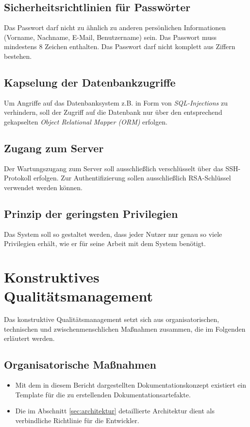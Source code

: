 \documentclass[a4paper,11pt,listof=numbered,glossary=totoc,parskip=half,toc=bib]{scrreprt}
\begin{document}
	\subsection{Sicherheitsrichtlinien für Passwörter}
	 Das Passwort darf nicht zu ähnlich zu anderen persönlichen Informationen (Vorname, Nachname, E-Mail, Benutzername) sein.
    Das Passwort muss mindestens 8 Zeichen enthalten.
    Das Passwort darf nicht komplett aus Ziffern bestehen.	
    
    \subsection{Kapselung der Datenbankzugriffe}
    Um Angriffe auf das Datenbanksystem z.B. in Form von \textit{SQL-Injections} zu verhindern, soll der Zugriff auf die Datenbank nur über den entsprechend gekapselten \textit{Object Relational Mapper (ORM)} erfolgen.
	
	\subsection{Zugang zum Server}
	Der Wartungszugang zum Server soll ausschließlich verschlüsselt über das SSH-Protokoll erfolgen. Zur Authentifizierung sollen ausschließlich RSA-Schlüssel verwendet werden können.
	
	\subsection{Prinzip der geringsten Privilegien}
	Das System soll so gestaltet werden, dass jeder Nutzer nur genau so viele Privilegien erhält, wie er für seine Arbeit mit dem System benötigt.
	
	\section{Konstruktives Qualitätsmanagement}
	Das konstruktive Qualitätsmanagement setzt sich aus organisatorischen, technischen und zwischenmenschlichen Maßnahmen zusammen, die im Folgenden erläutert werden.
	
	\subsection{Organisatorische Maßnahmen}
	\begin{itemize}
		\item Mit dem in diesem Bericht dargestellten Dokumentationskonzept existiert ein Template für die zu erstellenden Dokumentationsartefakte.
		\item Die im Abschnitt \ref{sec:architektur} detaillierte Architektur dient als verbindliche Richtlinie für die Entwickler.
	\end{itemize}		
	
\end{document}
